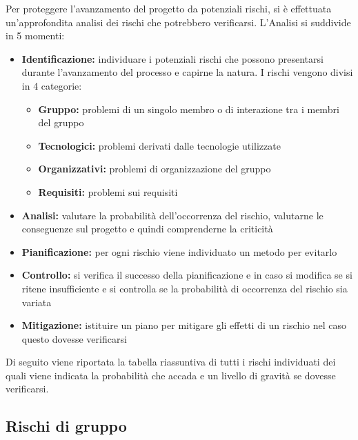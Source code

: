 \documentclass[12pt,a4paper]{article}
\begin{document}
Per proteggere l’avanzamento del progetto da potenziali rischi, si è effettuata un’approfondita analisi dei rischi che potrebbero verificarsi. L’Analisi si suddivide in 5 momenti:
\begin{itemize}
	\item \textbf{Identificazione:} individuare i potenziali rischi che possono presentarsi durante l’avanzamento del processo e capirne la natura. I rischi vengono divisi in 4 categorie:
	\begin{itemize}
		\item \textbf{Gruppo:} problemi di un singolo membro o di interazione tra i membri del gruppo
		\item \textbf{Tecnologici:} problemi derivati dalle tecnologie utilizzate
		\item \textbf{Organizzativi:} problemi di organizzazione del gruppo
		\item \textbf{Requisiti:} problemi sui requisiti
	\end{itemize}
	\item \textbf{Analisi:} valutare la probabilità dell’occorrenza del rischio, valutarne le conseguenze sul progetto e quindi comprenderne la criticità
	\item \textbf{Pianificazione:} per ogni rischio viene individuato un metodo per evitarlo
	\item \textbf{Controllo:} si verifica il successo della pianificazione e in caso si modifica se si ritene insufficiente e si controlla se la probabilità di occorrenza del rischio sia variata
	\item \textbf{Mitigazione:} istituire un piano per mitigare gli effetti di un rischio nel caso questo dovesse verificarsi
\end{itemize}

Di seguito viene riportata la tabella riassuntiva di tutti i rischi individuati dei quali viene indicata la probabilità che accada e un livello di gravità se dovesse verificarsi.

\subsection{Rischi di gruppo}
\end{document}
